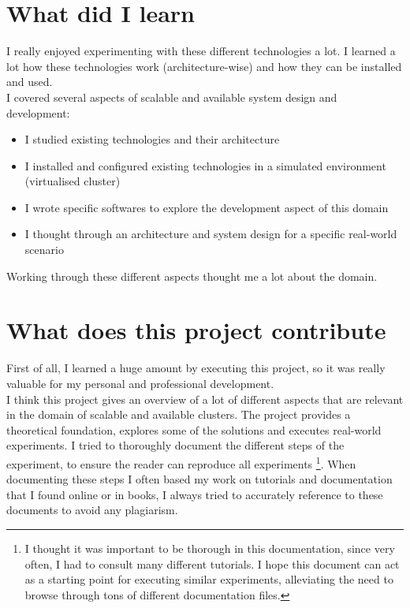 \documentclass[12pt]{report}
\begin{document}
\section{What did I learn}
I really enjoyed experimenting with these different technologies a lot. I
learned a lot how these technologies work (architecture-wise) and how
they can be installed and used.\\
I covered several aspects of scalable and available system design and
development: 
\begin{itemize}
\item I studied existing technologies and their architecture
\item I installed and configured existing technologies in a simulated
  environment (virtualised cluster)
\item I wrote specific softwares to explore the development aspect of
  this domain
\item I thought through an architecture and system design for a
  specific real-world scenario
\end{itemize}
Working through these different aspects thought me a lot about the
domain. 

\section{What does this project contribute}
First of all, I learned a huge amount by executing this project, so it
was really valuable for my personal and professional development.\\
I think this project gives an overview of a lot of different aspects
that are relevant in the domain of scalable and available
clusters. The project provides a theoretical foundation, explores
some of the solutions and executes real-world experiments. I tried to
thoroughly document the different steps of the experiment, to ensure
the reader can reproduce all experiments \footnote{I thought it was
  important to be thorough in this documentation, since very often, I
  had to consult many different tutorials. I hope this document can
  act as a starting point for executing similar experiments,
  alleviating the need to browse through tons of different
  documentation files.}. When documenting these steps
I often based my work on tutorials and documentation that I found
online or in books, I always tried to accurately reference to these
documents to avoid any plagiarism.




{}


\end{document}
